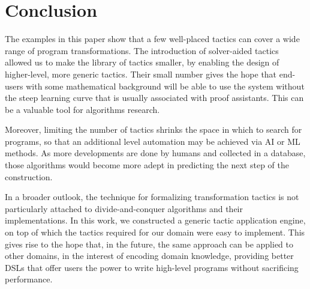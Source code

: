 \section{Conclusion}
\label{conc}

\cbstart{}%
The examples in this paper show that a few well-placed tactics can cover a wide range
of program transformations. The introduction of solver-aided tactics allowed us to make
the library of tactics smaller, by enabling the design of higher-level, more generic
tactics. Their small number gives the hope that end-users with some mathematical background
will be able to use the system without the steep learning curve that is usually associated
with proof assistants. This can be a valuable tool for algorithms research.

Moreover, limiting the number of tactics shrinks the space in which to search for programs,
so that an additional level automation may be achieved via AI or ML methods. As more
developments are done by humans and collected in a database, those algorithms would become
more adept in predicting the next step of the construction.

In a broader outlook, the technique for formalizing transformation tactics is not
particularly attached to divide-and-conquer algorithms and their implementations.
In this work, we constructed a generic tactic application engine, on top of which
the tactics required for our domain were easy to implement.
This gives rise to the hope that, in the future, the same approach can be applied
to other domains, in the interest of encoding domain knowledge, providing better
DSLs that offer users the power to write high-level programs without sacrificing
performance.
\cbend